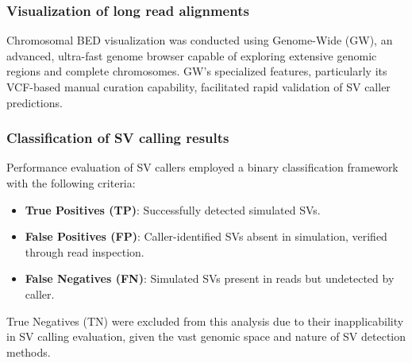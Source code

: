 \subsubsection{Visualization of long read alignments}

Chromosomal BED visualization was conducted using Genome-Wide (GW), an advanced, 
ultra-fast genome browser capable of exploring extensive genomic regions and 
complete chromosomes. GW's specialized features, particularly its VCF-based 
manual curation capability, facilitated rapid validation of SV caller 
predictions.


\subsubsection{Classification of SV calling results}

Performance evaluation of SV callers employed a binary classification framework 
with the following criteria:

\begin{itemize}[label=\tiny\raise.5ex\hbox{•}, leftmargin=\parindent]

    \item \textbf{True Positives (TP)}: Successfully detected simulated SVs.
    
    \item \textbf{False Positives (FP)}: Caller-identified SVs absent in 
    simulation, verified through read inspection.
    
    \item \textbf{False Negatives (FN)}: Simulated SVs present in reads but 
    undetected by caller.

\end{itemize}

True Negatives (TN) were excluded from this analysis due to their 
inapplicability in SV calling evaluation, given the vast genomic space and 
nature of SV detection methods.


